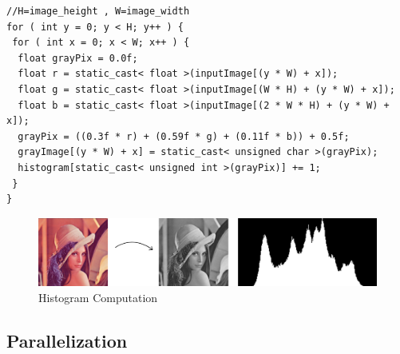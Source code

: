 \documentclass[a4paper]{article}
\begin{document}
\begin{lstlisting}[label=histo_loop, caption=Sequential code]
//H=image_height , W=image_width
for ( int y = 0; y < H; y++ ) {
 for ( int x = 0; x < W; x++ ) {
  float grayPix = 0.0f;
  float r = static_cast< float >(inputImage[(y * W) + x]);
  float g = static_cast< float >(inputImage[(W * H) + (y * W) + x]);
  float b = static_cast< float >(inputImage[(2 * W * H) + (y * W) + x]);
  grayPix = ((0.3f * r) + (0.59f * g) + (0.11f * b)) + 0.5f;
  grayImage[(y * W) + x] = static_cast< unsigned char >(grayPix);
  histogram[static_cast< unsigned int >(grayPix)] += 1;
 }
}
\end{lstlisting}

\begin{figure}[!ht]
    \centering
    \includegraphics[width=0.7\linewidth]{histo}
    \caption{Histogram Computation}
    \label{fig:histo}
\end{figure}
\FloatBarrier

\subsection{Parallelization}
\label{sec:p2}
\end{document}
